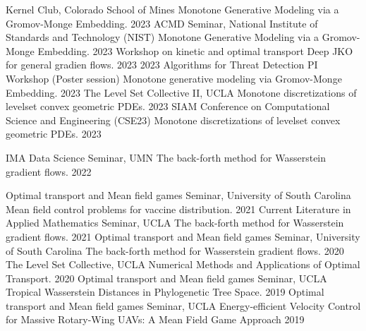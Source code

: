 

\begingroup
\allowdisplaybreaks
\begin{cvtalks}
\cvtalk
    {Kernel Club, Colorado School of Mines} %
    {Monotone Generative Modeling via a Gromov-Monge Embedding.} %
    {2023} %
\cvtalk
    {ACMD Seminar, National Institute of Standards and Technology (NIST)} %
    {Monotone Generative Modeling via a Gromov-Monge Embedding.} %
    {2023} %
\cvtalk
    {Workshop on kinetic and optimal transport} %
    {Deep JKO for general gradien flows.} %
    {2023} %
  \pagebreak
  \cvtalk
    {2023 Algorithms for Threat Detection PI Workshop (Poster session)} %
    {Monotone generative modeling via Gromov-Monge Embedding.} %
    {2023} %
  \cvtalk
    {The Level Set Collective II, UCLA} %
    {Monotone discretizations of levelset convex geometric PDEs.} %
    {2023} %
  \cvtalk
    {SIAM Conference on Computational Science and Engineering (CSE23)} %
    {Monotone discretizations of levelset convex geometric PDEs.} %
    {2023} %

  \cvtalk
    {IMA Data Science Seminar, UMN} %
    {The back-forth method for Wasserstein gradient flows.} %
    {2022} %

  \cvtalk
    {Optimal transport and Mean field games Seminar, University of South Carolina} %
    {Mean field control problems for vaccine distribution.} %
    {2021} %
  \cvtalk
    {Current Literature in Applied Mathematics Seminar, UCLA} %
    {The back-forth method for Wasserstein gradient flows.} %
    {2021} %
  \cvtalk
    {Optimal transport and Mean field games Seminar, University of South Carolina} %
    {The back-forth method for Wasserstein gradient flows.} %
    {2020} %
  \cvtalk
    {The Level Set Collective, UCLA} %
    {Numerical Methods and Applications of Optimal Transport.} %
    {2020} %
  \cvtalk
    {Optimal transport and Mean field games Seminar, UCLA} %
    {Tropical Wasserstein Distances in Phylogenetic Tree Space.} %
    {2019} %
    \cvtalk
    {Optimal transport and Mean field games Seminar, UCLA} %
    {Energy-efficient Velocity Control for Massive Rotary-Wing UAVs: A Mean Field Game Approach} %
    {2019} %
\end{cvtalks}
\endgroup

